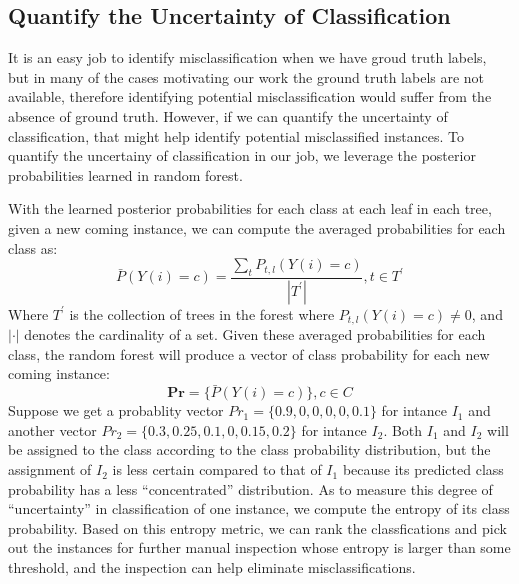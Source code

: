 
\subsection{Quantify the Uncertainty of Classification}
It is an easy job to identify misclassification when we have groud truth labels, but in many of the cases motivating
our work the ground truth labels are not available, therefore identifying potential misclassification
would suffer from the absence of ground truth. However, if we can quantify the uncertainty of classification, that might help identify potential misclassified 
instances. To quantify the uncertainy of classification in our job, we leverage the posterior probabilities learned in random forest.

With the learned posterior probabilities for each class at each leaf in each tree, given a new coming instance, we can compute the averaged probabilities for each class as:
\begin{displaymath}
    \bar P(Y(i)=c) = \frac{\sum_{t} P_{t,l}(Y(i)=c)}{|T^{'}|}, t\in T^{'}
\end{displaymath}
Where $T^{'}$ is the collection of trees in the forest where $P_{t,l}(Y(i)=c)\neq 0$, and $|\cdot|$ denotes the cardinality of a set. Given these averaged 
probabilities for each class, the random forest will produce a vector of class probability for each new coming instance:
\begin{displaymath}
\textbf{Pr} = \{\bar P(Y(i)=c)\}, c\in C
\end{displaymath}
Suppose we get a probablity vector $Pr_{1} = \{0.9, 0, 0, 0, 0, 0.1\}$ for intance $I_{1}$ and another vector $Pr_{2} = \{0.3, 0.25, 0.1, 0, 0.15, 0.2\}$ for intance $I_{2}$. Both $I_{1}$ and $I_{2}$ will be assigned to the class according to the class probability distribution, but the assignment of $I_{2}$ is less certain compared to that of $I_{1}$ because its predicted class probability has a less ``concentrated'' distribution. As to measure this degree of ``uncertainty'' in classification of one instance, we compute the entropy of its class probability. Based on this entropy metric, we can rank the classfications and pick out the instances for further manual inspection whose entropy is larger than some threshold, and the inspection can help eliminate misclassifications.
